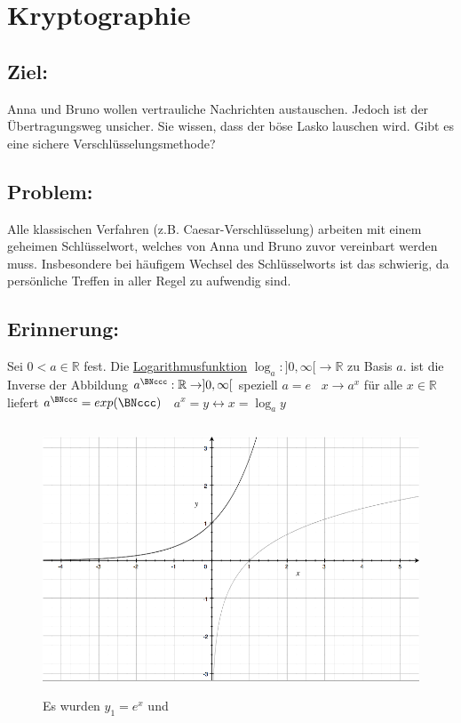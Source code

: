 \section{Kryptographie}
%
%
%
\subsection{Ziel:}
Anna und Bruno wollen vertrauliche Nachrichten austauschen. Jedoch ist der Übertragungsweg unsicher. Sie wissen, dass der böse Lasko lauschen wird. Gibt es eine sichere Verschlüsselungsmethode?
%
%
%
\subsection{Problem:}
Alle klassischen Verfahren (z.B. Caesar-Verschlüsselung) arbeiten mit einem geheimen Schlüsselwort, welches von Anna und Bruno zuvor vereinbart werden muss. Insbesondere bei häufigem Wechsel des Schlüsselworts ist das schwierig, da persönliche Treffen in aller Regel zu aufwendig sind. 
%
%
%
\subsection{Erinnerung:}
Sei $0 < a \in \mathbb{R}$ fest. Die \underline{Logarithmusfunktion} $\log_{a}: ]0, \infty [ \rightarrow \mathbb{R}$ zu Basis $a$. ist die Inverse der Abbildung $a^{\BNccc}: \mathbb{R} \rightarrow ]0, \infty [$ speziell $a = e$ \ $x \rightarrow a^{x}$ für alle $ x \in \mathbb{R}$ liefert $ a^{\BNccc} = exp (\BNccc)$ \ $a^{x} = y \leftrightarrow x = \log_{a} y$ \\

\begin{figure} [H]
	\centering
	\includegraphics[width=12cm, height=8cm]{mainmatter/chapter2/pics/graphkryp.png}
	\caption{Es wurden $y_{1}= e^{x}$ und } 
\end{figure}
%
%
%
